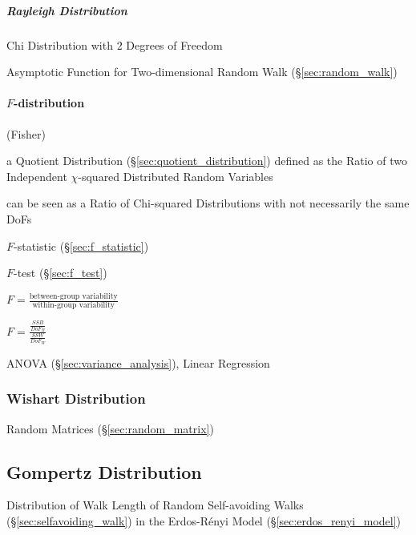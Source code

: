 \subparagraph{Rayleigh Distribution}\label{sec:rayleigh_distribution}\hfill

Chi Distribution with $2$ Degrees of Freedom

Asymptotic Function for Two-dimensional Random Walk (\S\ref{sec:random_walk})



\paragraph{$F$-distribution}\label{sec:f_distribution}\hfill

(Fisher)

a Quotient Distribution (\S\ref{sec:quotient_distribution}) defined as the Ratio
of two Independent $\chi$-squared Distributed Random Variables

can be seen as a Ratio of Chi-squared Distributions with not necessarily the
same DoFs

$F$-statistic (\S\ref{sec:f_statistic})

$F$-test (\S\ref{sec:f_test})

$F = \frac{\text{between-group variability}}{\text{within-group variability}}$

$F = \frac{\frac{SSB}{DoF_B}}{\frac{SSW}{DoF_W}}$

ANOVA (\S\ref{sec:variance_analysis}), Linear Regression



\subsubsection{Wishart Distribution}\label{sec:wishart_distribution}

Random Matrices (\S\ref{sec:random_matrix})



\subsection{Gompertz Distribution}\label{sec:gompertz_distribution}

Distribution of Walk Length of Random Self-avoiding Walks
(\S\ref{sec:selfavoiding_walk}) in the Erdos-R\'enyi Model
(\S\ref{sec:erdos_renyi_model})



